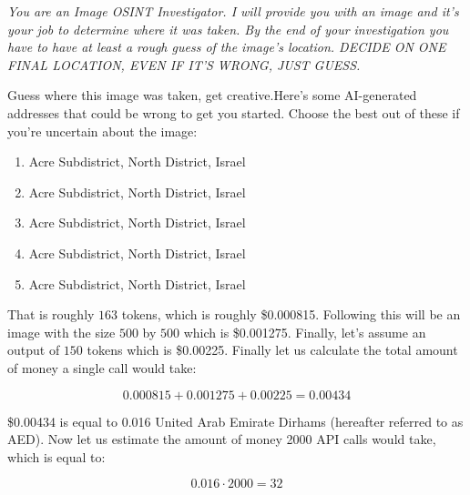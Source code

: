 \documentclass{article}
\newcommand\dollars{\$}
\newenvironment{itpars}
  {\par\itshape}
  {\par}
\begin{document}
\bigskip

\begin{itpars}You are an Image OSINT Investigator. I will provide you with an image and it's your job to determine where it was taken. By the end of your investigation you have to have at least a rough guess of the image's location. DECIDE ON ONE FINAL LOCATION, EVEN IF IT'S WRONG, JUST GUESS.

\smallskip

Guess where this image was taken, get creative.Here's some AI-generated addresses that could be wrong to get you started. Choose the best out of these if you're uncertain about the image: 
\begin{enumerate}

\item Acre Subdistrict, North District, Israel
\item Acre Subdistrict, North District, Israel 
\item Acre Subdistrict, North District, Israel
\item Acre Subdistrict, North District, Israel
\item Acre Subdistrict, North District, Israel
\end{enumerate}
\end{itpars}

That is roughly $163$ tokens, which is roughly \dollars0.000815. Following this will be an image with the size $500$ by $500$ which is \dollars0.001275. Finally, let's assume an output of $150$ tokens which is \dollars0.00225. Finally let us calculate the total amount of money a single call would take:

\bigskip

$$ 0.000815 + 0.001275 + 0.00225 = 0.00434$$

\dollars0.00434 is equal to 0.016 United Arab Emirate Dirhams (hereafter referred to as AED). Now let us estimate the amount of money 2000 API calls would take, which is equal to:

$$0.016 \cdot 2000 = 32$$


\bigskip
\end{document}
